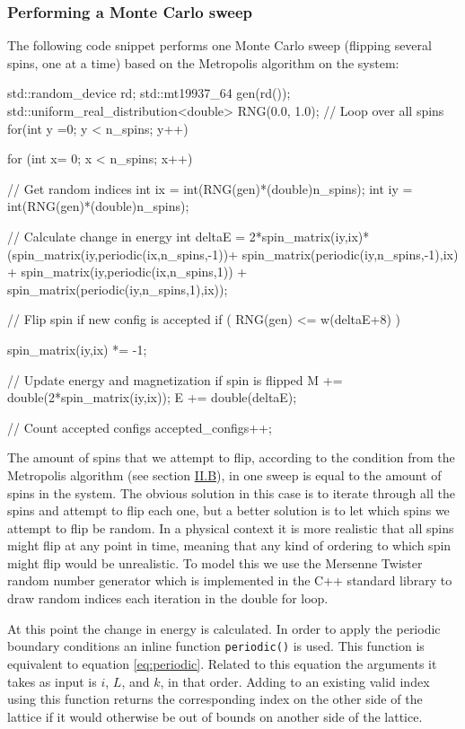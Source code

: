 \documentclass[reprint,english,notitlepage]{revtex4-1}  %
\begin{document}
\subsubsection{Performing a Monte Carlo sweep} \label{sec:III:a:ii}

The following code snippet performs one Monte Carlo sweep (flipping several spins, one at a time) based on the Metropolis algorithm on the system:

\begin{cpp}
std::random_device rd;
std::mt19937_64 gen(rd());
std::uniform_real_distribution<double> RNG(0.0, 1.0);
// Loop over all spins
for(int y =0; y < n_spins; y++) {
  for (int x= 0; x < n_spins; x++){

    // Get random indices
    int ix = int(RNG(gen)*(double)n_spins);
    int iy = int(RNG(gen)*(double)n_spins);

    // Calculate change in energy
    int deltaE =  2*spin_matrix(iy,ix)*
                  (spin_matrix(iy,periodic(ix,n_spins,-1))+
                  spin_matrix(periodic(iy,n_spins,-1),ix) +
                  spin_matrix(iy,periodic(ix,n_spins,1)) +
                  spin_matrix(periodic(iy,n_spins,1),ix));


    // Flip spin if new config is accepted
    if ( RNG(gen) <= w(deltaE+8) ) {
      spin_matrix(iy,ix) *= -1;


      // Update energy and magnetization if spin is flipped
      M += double(2*spin_matrix(iy,ix));
      E += double(deltaE);

      // Count accepted configs
      accepted_configs++;
    }
  }
}
\end{cpp}

The amount of spins that we attempt to flip, according to the condition from the Metropolis algorithm (see section \hyperref[sec:II:b]{II.B}), in one sweep is equal to the amount of spins in the system. The obvious solution in this case is to iterate through all the spins and attempt to flip each one, but a better solution is to let which spins we attempt to flip be random. In a physical context it is more realistic that all spins might flip at any point in time, meaning that any kind of ordering to which spin might flip would be unrealistic. To model this we use the Mersenne Twister random number generator \citep{MersenneTwister} which is implemented in the C++ standard library to draw random indices each iteration in the double for loop. 

At this point the change in energy is calculated. In order to apply the periodic boundary conditions an inline function \verb+periodic()+ is used. This function is equivalent to equation \eqref{eq:periodic}. Related to this equation the arguments it takes as input is $i$, $L$, and $k$, in that order. Adding to an existing valid index using this function returns the corresponding index on the other side of the lattice if it would otherwise be out of bounds on another side of the lattice.
\end{document}
